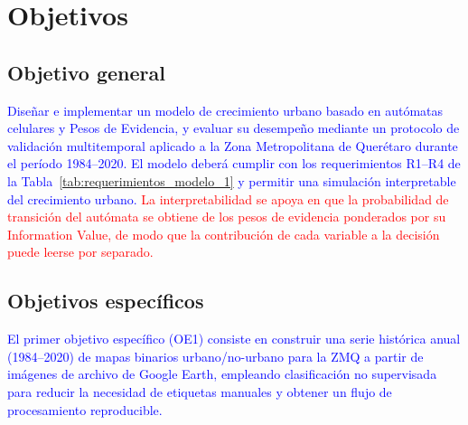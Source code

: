\section{Objetivos}

\subsection{Objetivo general}

\textcolor{blue}{Diseñar e implementar un modelo de crecimiento urbano basado en autómatas celulares y Pesos de Evidencia, y evaluar su desempeño mediante un protocolo de validación multitemporal aplicado a la Zona Metropolitana de Querétaro durante el período 1984--2020. El modelo deberá cumplir con los requerimientos R1--R4 de la Tabla~\ref{tab:requerimientos_modelo_1} y permitir una simulación interpretable del crecimiento urbano.} \textcolor{red}{La interpretabilidad se apoya en que la probabilidad de transición del autómata se obtiene de los pesos de evidencia ponderados por su Information Value, de modo que la contribución de cada variable a la decisión puede leerse por separado.}


\subsection{Objetivos específicos}

\textcolor{blue}{El primer objetivo específico (OE1) consiste en construir una serie histórica anual (1984--2020) de mapas binarios urbano/no-urbano para la ZMQ a partir de imágenes de archivo de Google Earth, empleando clasificación no supervisada para reducir la necesidad de etiquetas manuales y obtener un flujo de procesamiento reproducible.}


